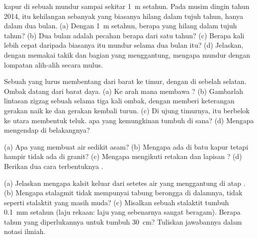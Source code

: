 \begin{exercise}[$\star\star$]\label{exo:g9:landforms:6}
 kapur di sebuah  mundur sampai sekitar \qty{1}{m} setahun.
Pada musim dingin tahun 2014,  itu kehilangan sebanyak yang biasanya
hilang dalam tujuh tahun, hanya dalam dua bulan. (a) Dengan \qty{1}{m}
setahun, berapa yang hilang dalam tujuh tahun? (b) Dua bulan adalah
pecahan berapa dari satu tahun? (c) Berapa kali lebih cepat daripada
biasanya  itu mundur selama dua bulan itu? (d) Jelaskan, dengan
memakai takik dan bagian yang menggantung, mengapa  mundur dengan
lompatan alih-alih secara mulus.
\end{exercise}

\begin{exercise}[$\star\star$]\label{exo:g9:landforms:7}
Sebuah  yang lurus membentang dari barat ke timur, dengan  di
sebelah selatan. Ombak datang dari barat daya. (a) Ke arah mana  membawa ? (b) Gambarlah lintasan zigzag sebuah
 selama tiga kali ombak, dengan memberi keterangan gerakan naik ke
 dan gerakan kembali turun. (c) Di ujung timurnya,  itu
berbelok ke utara membentuk teluk.  apa yang kemungkinan
tumbuh di sana? (d) Mengapa  mengendap di belakangnya?
\end{exercise}

\begin{exercise}[$\star\star$]\label{exo:g9:landforms:8}
(a) Apa yang membuat air  sedikit asam? (b) Mengapa ada  di batu
kapur tetapi hampir tidak ada di granit? (c) Mengapa  mengikuti
retakan dan lapisan ? (d) Berikan dua cara terbentuknya .
\end{exercise}

\begin{exercise}[$\star\star$]\label{exo:g9:landforms:9}
(a) Jelaskan mengapa kalsit keluar dari setetes air yang menggantung di
atap . (b) Mengapa stalagmit tidak mempunyai tabung berongga di
dalamnya, tidak seperti stalaktit yang masih muda? (c) Misalkan sebuah
stalaktit tumbuh \qty{0.1}{mm} setahun (laju rekaan: laju yang sebenarnya
sangat beragam). Berapa tahun yang diperlukannya untuk tumbuh
\qty{30}{cm}? Tuliskan jawabannya dalam notasi ilmiah.
\end{exercise}


